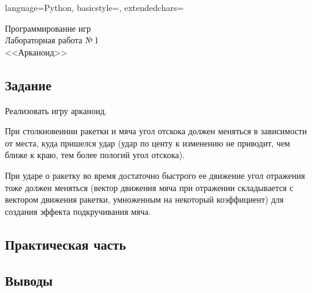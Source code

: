 \documentclass[12pt]{article}
\newcommand{\StudentName}{Ильвохин Дмитрий}
\newcommand{\Group}{1O-106М}
\newcommand{\CourseName}{Программирование игр}
\newcommand{\LabNum}{1}
\newcommand{\Subject}{Арканоид}
\begin{document}

\lstset
{
        language=Python,
        basicstyle=\footnotesize,%
        extendedchars=\true
}

\begin{flushright}
\Large{
	\CourseName \\
	Лабораторная работа №\,\LabNum \\
	<<\Subject>> \\
}
\end{flushright}

\subsection*{Задание}
Реализовать игру арканоид.

При столкновеинии ракетки и мяча угол отскока должен меняться в зависимости от места,
куда пришелся удар (удар по центу к изменению не приводит, чем ближе к краю,
тем более пологий угол отскока).

При ударе о ракетку во время достаточно быстрого ее движение угол отражения тоже должен меняться
(вектор движения мяча при отражении складывается с вектором движения ракетки, 
умноженным на некоторый коэффициент) для создания эффекта подкручивания мяча.

\subsection*{Практическая часть}

\subsection*{Выводы}
\end{document}
